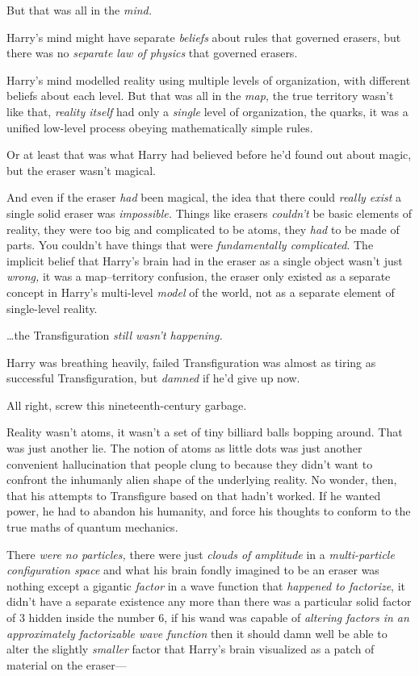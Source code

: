 But that was all in the \emph{mind.}

Harry’s mind might have separate \emph{beliefs} about rules that governed erasers, but there was no \emph{separate law of physics} that governed erasers.

Harry’s mind modelled reality using multiple levels of organization, with different beliefs about each level. But that was all in the \emph{map,} the true territory wasn’t like that, \emph{reality itself} had only a \emph{single} level of organization, the quarks, it was a unified low-level process obeying mathematically simple rules.

Or at least that was what Harry had believed before he’d found out about magic, but the eraser wasn’t magical.

And even if the eraser \emph{had} been magical, the idea that there could \emph{really exist} a single solid eraser was \emph{impossible.} Things like erasers \emph{couldn’t} be basic elements of reality, they were too big and complicated to be atoms, they \emph{had} to be made of parts. You couldn’t have things that were \emph{fundamentally complicated}. The implicit belief that Harry’s brain had in the eraser as a single object wasn’t just \emph{wrong,} it was a map–territory confusion, the eraser only existed as a separate concept in Harry’s multi-level \emph{model} of the world, not as a separate element of single-level reality.

…the Transfiguration \emph{still wasn’t happening.}

Harry was breathing heavily, failed Transfiguration was almost as tiring as successful Transfiguration, but \emph{damned} if he’d give up now.

All right, screw this nineteenth-century garbage.

Reality wasn’t atoms, it wasn’t a set of tiny billiard balls bopping around. That was just another lie. The notion of atoms as little dots was just another convenient hallucination that people clung to because they didn’t want to confront the inhumanly alien shape of the underlying reality. No wonder, then, that his attempts to Transfigure based on that hadn’t worked. If he wanted power, he had to abandon his humanity, and force his thoughts to conform to the true maths of quantum mechanics.

There \emph{were no particles,} there were just \emph{clouds of amplitude} in a \emph{multi-particle configuration space} and what his brain fondly imagined to be an eraser was nothing except a gigantic \emph{factor} in a wave function that \emph{happened to factorize}, it didn’t have a separate existence any more than there was a particular solid factor of 3 hidden inside the number 6, if his wand was capable of \emph{altering factors in an approximately factorizable wave function} then it should damn well be able to alter the slightly \emph{smaller} factor that Harry’s brain visualized as a patch of material on the eraser—

